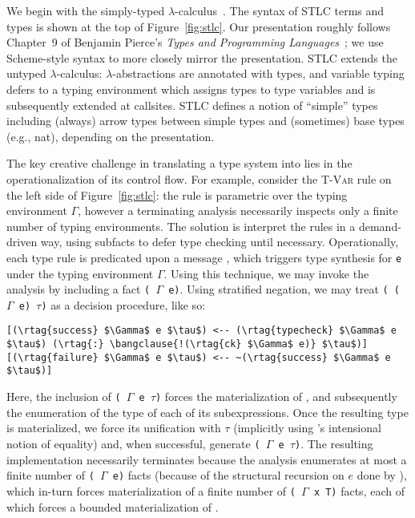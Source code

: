 We begin with the simply-typed
$\lambda$-calculus~\cite{barendregt2013lambda,tapl}.  The syntax of
STLC terms and types is shown at the top of Figure~\ref{fig:stlc}. Our
presentation roughly follows Chapter~9 of Benjamin Pierce's
\textit{Types and Programming Languages}~\cite{tapl}; we use
Scheme-style syntax to more closely mirror the \slog{}
presentation. STLC extends the untyped $\lambda$-calculus:
$\lambda$-abstractions are annotated with types, and variable typing
defers to a typing environment which assigns types to type variables
and is subsequently extended at callsites.  STLC defines a notion of
``simple'' types including (always) arrow types between simple types
and (sometimes) base types (e.g., \textsf{nat}), depending on the
presentation.
 
The key creative challenge in translating a type system into \slog{}
lies in the operationalization of its control flow. For example,
consider the \textsc{T-Var} rule on the left side of
Figure~\ref{fig:stlc}: the rule is parametric over the typing
environment $\Gamma$, however a terminating analysis necessarily
inspects only a finite number of typing environments. The solution is
interpret the rules in a demand-driven way, using subfacts to defer
type checking until necessary. Operationally, each type rule is
predicated upon a message \texttt{}, which triggers type synthesis for \texttt{e} under the
typing environment $\Gamma$.  Using this technique, we may invoke the
analysis by including a fact \texttt{( $\Gamma$ e)}. Using
stratified negation, we may treat \texttt{(\rtag{:} (
  $\Gamma$ e) $\tau$)} as a decision procedure, like so:

\begin{Verbatim}[baselinestretch=1,commandchars=\\\{\},codes={\catcode`$=3\catcode`^=7}]
[(\rtag{success} $\Gamma$ e $\tau$) <-- (\rtag{typecheck} $\Gamma$ e $\tau$) (\rtag{:} \bangclause{!(\rtag{ck} $\Gamma$ e)} $\tau$)]
[(\rtag{failure} $\Gamma$ e $\tau$) <-- ~(\rtag{success} $\Gamma$ e $\tau$)]
\end{Verbatim}

Here, the inclusion of \texttt{( $\Gamma$ e $\tau$)}
forces the materialization of \texttt{}, and subsequently the enumeration of the type of each of its
subexpressions. Once the resulting type is materialized, we force its
unification with $\tau$ (implicitly using \slog{}'s intensional notion
of equality) and, when successful, generate \texttt{(
  $\Gamma$ e $\tau$)}. The resulting \slog{} implementation
necessarily terminates because the analysis enumerates at most a
finite number of \texttt{( $\Gamma$ e)} facts (because of the
structural recursion on $e$ done by \rtag{:}), which in-turn forces
materialization of a finite number of \texttt{(
  $\Gamma$ x T)} facts, each of which forces a bounded
materialization of .

